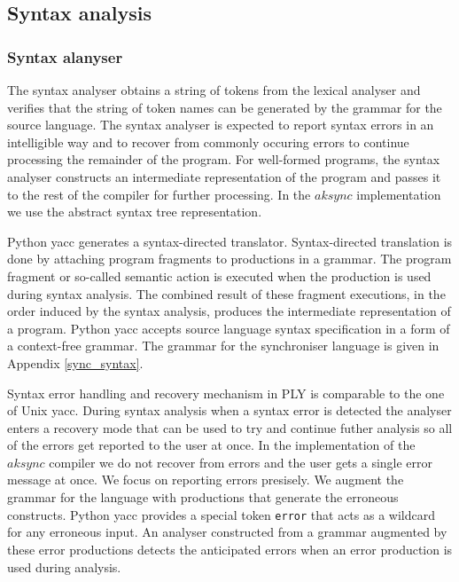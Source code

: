 

\subsection{Syntax analysis}
  \subsubsection{Syntax alanyser}
The syntax analyser obtains a string of tokens from the lexical analyser and verifies that the string of token names can be generated by the grammar for the source language. The syntax analyser is expected to report syntax errors in an intelligible way and to recover from commonly occuring errors to continue processing the remainder of the program. For well-formed programs, the syntax analyser constructs an intermediate representation of the program and passes it to the rest of the compiler for further processing. In the $aksync$ implementation we use the abstract syntax tree representation.

Python yacc generates a syntax-directed translator. Syntax-directed translation is done by attaching program fragments to productions in a grammar. The program fragment or so-called semantic action is executed when the production is used during syntax analysis. The combined result of these fragment executions, in the order induced by the syntax analysis, produces the intermediate representation of a program. Python yacc accepts source language syntax specification in a form of a context-free grammar. The grammar for the synchroniser language is given in Appendix \ref{sync_syntax}.

Syntax error handling and recovery mechanism in PLY is comparable to the one of Unix yacc. During syntax analysis when a syntax error is detected the analyser enters a recovery mode that can be used to try and continue futher analysis so all of the errors get reported to the user at once. In the implementation of the $aksync$ compiler we do not recover from errors and the user gets a single error message at once. We focus on reporting errors presisely. We augment the grammar for the language with productions that generate the erroneous constructs. Python yacc provides a special token \texttt{error} that acts as a wildcard for any erroneous input. An analyser constructed from a grammar augmented by these error productions detects the anticipated errors when an error production is used during analysis.

